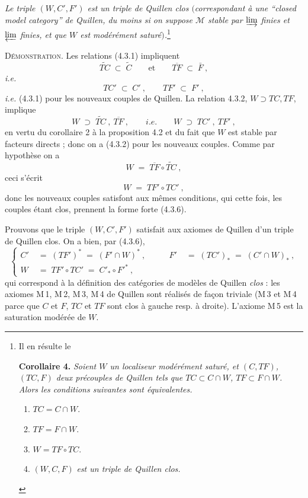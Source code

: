 \documentclass[11pt]{article}
\newcommand{\printedpage}[1]{\marginpar{\footnotesize p.~#1}}
\newcommand{\msp}[1]{\marginpar{\footnotesize [#1]}}
\begin{document}
\msp{page 36}
\textit{Le triple $(W,C',F')$ est un triple de Quillen clos $($correspondant à une “closed model category” de Quillen, du moins si on suppose $\mathcal{M}$ stable par $\varinjlim$ finies et $\varprojlim$ finies, et que $W$ est modérément saturé$)$.}\footnote[13]{Il en résulte le\par
\textbf{Corollaire 4.} \textit{Soient $W$ un localiseur modérément saturé, et $(C,TF)$, $(TC,F)$ deux précouples de Quillen tels que $TC\subset C\cap W$, $TF\subset F\cap W$. Alors les conditions suivantes sont équivalentes.}
\begin{enumerate}[leftmargin=*]
\item[a)] $TC=C\cap W$.
\item[b)] $TF=F\cap W$.
\item[c)] $W=TF\circ TC$.
\item[d)] $(W,C,F)$ \textit{est un triple de Quillen clos.}
\end{enumerate}}

\textsc{Démonstration.} Les relations (4.3.1) impliquent
\[
\widetilde{TC}\;\subset\;\widetilde{C}\qquad\text{et}\qquad\overline{TF}\;\subset\;\bar{F}\ ,
\]
\printedpage{25}
\textit{i.e.}
\[
TC'\;\subset\;C'\ ,\qquad TF'\;\subset\;F'\ ,
\]
\textit{i.e.} (4.3.1) pour les nouveaux couples de Quillen. La relation 4.3.2, $W\supset TC,TF$, implique
\[
W\;\supset\;\widetilde{TC}\ ,\ \overline{TF}\ ,\qquad \textit{i.e.}\qquad W\;\supset\;TC'\ ,\ TF'\ ,
\]
en vertu du corollaire 2 à la proposition 4.2 et du fait que $W$ est stable par facteurs directs ; donc on a (4.3.2) pour les nouveaux couples. Comme par hypothèse on a
\[
W\;=\;\overline{TF}\circ\widetilde{TC}\ ,
\]
ceci s'écrit
\[
W\;=\;TF'\circ TC'\ ,
\]
donc les nouveaux couples satisfont aux mêmes conditions, qui cette fois, les couples étant clos, prennent la forme forte (4.3.6).

Prouvons que le triple $(W,C',F')$ satisfait aux axiomes de Quillen d'un triple de Quillen clos. On a bien, par (4.3.6),
\[
\left\{
\begin{aligned}
C' &\;=\;(TF')^*\;=\;(F'\cap W)^*\ , &\qquad F' &\;=\;(TC')_*\;=\;(C'\cap W)_*\ ,\\
W &\;=\;TF'\circ TC'\;=\;C'_*\circ F'^*\ ,
\end{aligned}
\right.
\]
qui correspond à la définition des catégories de modèles de Quillen \textit{clos} : les axiomes M\,1, M\,2, M\,3, M\,4 de Quillen sont réalisés de façon triviale (M\,3 et M\,4 parce que
\msp{page 37}
$C$ et $F$, $TC$ et $TF$ sont clos à gauche resp. à droite). L'axiome M\,5 est la saturation modérée de $W$.
\end{document}
